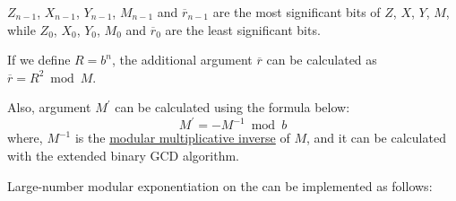 \documentclass[main\_\_EN.tex]{subfiles}
\begin{document}
\begin{math}Z_{n-1}\end{math},
\begin{math}X_{n-1}\end{math},
\begin{math}Y_{n-1}\end{math},
\begin{math}M_{n-1}\end{math} and
\begin{math}\overline{r}_{n-1}\end{math} are the most significant bits of
\begin{math}Z\end{math},
\begin{math}X\end{math},
\begin{math}Y\end{math},
\begin{math}M\end{math}, while
\begin{math}Z_{0}\end{math},
\begin{math}X_{0}\end{math},
\begin{math}Y_{0}\end{math},
\begin{math}M_{0}\end{math} and
\begin{math}\overline{r}_{0}\end{math} are the least significant bits.

If we define \begin{math}R = b^{n}\end{math}, the additional argument $\overline{r}$ can be calculated as \begin{math}\overline{r} = R^{2} \bmod M\end{math}. 

Also, argument $M^{\prime}$ can be calculated using the formula below:
\[
 M^{\prime} = - M^{-1} \bmod b
\]
where, $M^{-1}$ is the \href{https://en.wikipedia.org/wiki/Modular\_multiplicative\_inverse}{modular multiplicative inverse} of $M$, and it can be calculated with the extended binary GCD algorithm.


Large-number modular exponentiation on the \chipname{} can be implemented as follows:
\end{document}
